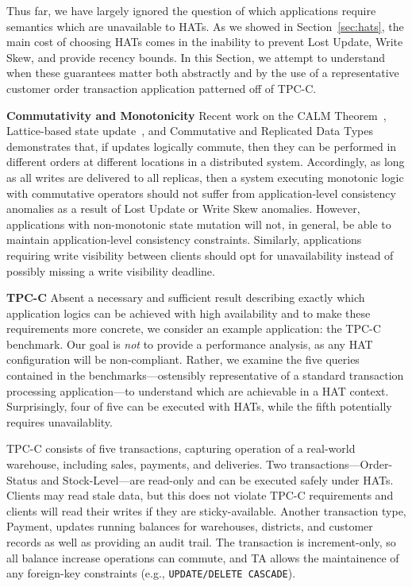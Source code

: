 Thus far, we have largely ignored the question of which applications
require semantics which are unavailable to HATs. As we showed in
Section~\ref{sec:hats}, the main cost of choosing HATs comes in the
inability to prevent Lost Update, Write Skew, and provide recency
bounds. In this Section, we attempt to understand when these
guarantees matter both abstractly and by the use of a representative
customer order transaction application patterned off of TPC-C.

\vspace{.5em}\noindent\textbf{Commutativity and Monotonicity} Recent work on
the CALM Theorem~\cite{calm}, Lattice-based state
update~\cite{blooml}, and Commutative and Replicated Data
Types~\cite{crdt} demonstrates that, if updates logically commute,
then they can be performed in different orders at different locations
in a distributed system. Accordingly, as long as all writes are
delivered to all replicas, then a system executing monotonic logic
with commutative operators should not suffer from application-level
consistency anomalies as a result of Lost Update or Write Skew
anomalies. However, applications with non-monotonic state mutation
will not, in general, be able to maintain application-level
consistency constraints. Similarly, applications requiring write
visibility between clients should opt for unavailability instead of
possibly missing a write visibility deadline.

\vspace{.5em}\noindent\textbf{TPC-C} Absent a necessary and sufficient
result describing exactly which application logics can be achieved
with high availability and to make these requirements more concrete,
we consider an example application: the TPC-C benchmark. Our goal is
\textit{not} to provide a performance analysis, as any HAT
configuration will be non-compliant. Rather, we examine the five
queries contained in the benchmarks---ostensibly representative of a
standard transaction processing application---to understand which are
achievable in a HAT context. Surprisingly, four of five can be
executed with HATs, while the fifth potentially requires unavailablity.

TPC-C consists of five transactions, capturing operation of a
real-world warehouse, including sales, payments, and deliveries. Two
transactions---Order-Status and Stock-Level---are read-only and can be
executed safely under HATs. Clients may read stale data, but this does
not violate TPC-C requirements and clients will read their writes if
they are sticky-available. Another transaction type, Payment, updates
running balances for warehouses, districts, and customer records as
well as providing an audit trail. The transaction is increment-only,
so all balance increase operations can commute, and TA allows the
maintainence of any foreign-key constraints (e.g.,
\texttt{UPDATE/DELETE CASCADE}).

